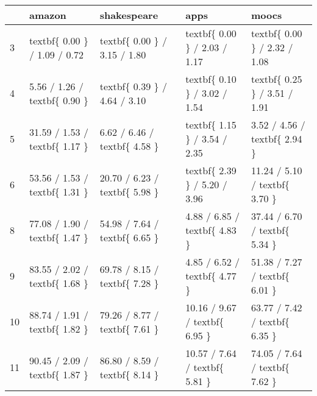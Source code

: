 \begin{tabular}{lllll}
\toprule
{} &                         amazon &                    shakespeare &                           apps &                          moocs \\
\midrule
3  &   textbf\{ 0.00 \} / 1.09 / 0.72 &   textbf\{ 0.00 \} / 3.15 / 1.80 &   textbf\{ 0.00 \} / 2.03 / 1.17 &   textbf\{ 0.00 \} / 2.32 / 1.08 \\
4  &   5.56 / 1.26 / textbf\{ 0.90 \} &   textbf\{ 0.39 \} / 4.64 / 3.10 &   textbf\{ 0.10 \} / 3.02 / 1.54 &   textbf\{ 0.25 \} / 3.51 / 1.91 \\
5  &  31.59 / 1.53 / textbf\{ 1.17 \} &   6.62 / 6.46 / textbf\{ 4.58 \} &   textbf\{ 1.15 \} / 3.54 / 2.35 &   3.52 / 4.56 / textbf\{ 2.94 \} \\
6  &  53.56 / 1.53 / textbf\{ 1.31 \} &  20.70 / 6.23 / textbf\{ 5.98 \} &   textbf\{ 2.39 \} / 5.20 / 3.96 &  11.24 / 5.10 / textbf\{ 3.70 \} \\
8  &  77.08 / 1.90 / textbf\{ 1.47 \} &  54.98 / 7.64 / textbf\{ 6.65 \} &   4.88 / 6.85 / textbf\{ 4.83 \} &  37.44 / 6.70 / textbf\{ 5.34 \} \\
9  &  83.55 / 2.02 / textbf\{ 1.68 \} &  69.78 / 8.15 / textbf\{ 7.28 \} &   4.85 / 6.52 / textbf\{ 4.77 \} &  51.38 / 7.27 / textbf\{ 6.01 \} \\
10 &  88.74 / 1.91 / textbf\{ 1.82 \} &  79.26 / 8.77 / textbf\{ 7.61 \} &  10.16 / 9.67 / textbf\{ 6.95 \} &  63.77 / 7.42 / textbf\{ 6.35 \} \\
11 &  90.45 / 2.09 / textbf\{ 1.87 \} &  86.80 / 8.59 / textbf\{ 8.14 \} &  10.57 / 7.64 / textbf\{ 5.81 \} &  74.05 / 7.64 / textbf\{ 7.62 \} \\
\bottomrule
\end{tabular}

